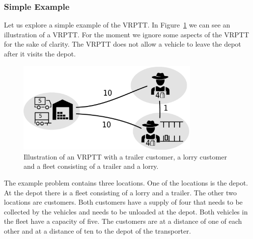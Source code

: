 
\subsubsection{Simple Example}

\label{sec:simple-example}

Let us explore a simple example of the VRPTT.
In Figure~\ref{fig:trivial} we can see an illustration of a VRPTT.
For the moment we ignore some aspects of the VRPTT for the sake of clarity.
The VRPTT does not allow a vehicle to leave the depot after it visits the depot.


\begin{figure}[!ht]
  \centering
    \includegraphics[width=0.8\textwidth]{img/trivial_example_withcapacity_v2.pdf}
  \caption{Illustration of an VRPTT with a trailer customer, a lorry customer and a fleet consisting of a trailer and a lorry.}
  \label{fig:trivial}
\end{figure}




The example problem contains three locations.
One of the locations is the depot.
At the depot there is a fleet consisting of a lorry and a trailer.
The other two locations are customers.
Both customers have a supply of four that needs to be collected by the vehicles and needs to be unloaded at the depot.
Both vehicles in the fleet have a capacity of five.
The customers are at a distance of one of each other and at a distance of ten to the depot of the transporter.\\

